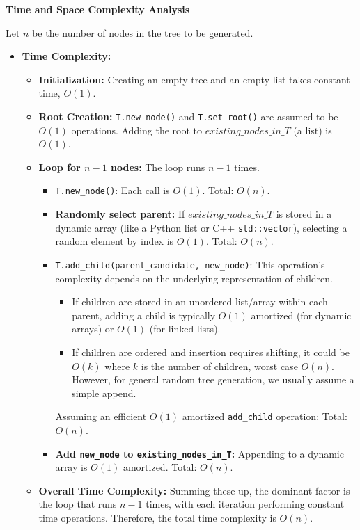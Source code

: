 \documentclass{article}
\begin{document}
\textbf{Time and Space Complexity Analysis}

Let $n$ be the number of nodes in the tree to be generated.

\begin{itemize}
    \item \textbf{Time Complexity:}
    \begin{itemize}
        \item \textbf{Initialization:} Creating an empty tree and an empty list takes constant time, $O(1)$.
        \item \textbf{Root Creation:} \texttt{T.new\_node()} and \texttt{T.set\_root()} are assumed to be $O(1)$ operations. Adding the root to $existing\_nodes\_in\_T$ (a list) is $O(1)$.
        \item \textbf{Loop for $n-1$ nodes:} The loop runs $n-1$ times.
        \begin{itemize}
            \item \texttt{T.new\_node()}: Each call is $O(1)$. Total: $O(n)$.
            \item \textbf{Randomly select parent:} If $existing\_nodes\_in\_T$ is stored in a dynamic array (like a Python list or C++ \texttt{std::vector}), selecting a random element by index is $O(1)$. Total: $O(n)$.
            \item \texttt{T.add\_child(parent\_candidate, new\_node)}: This operation's complexity depends on the underlying representation of children.
                \begin{itemize}
                    \item If children are stored in an unordered list/array within each parent, adding a child is typically $O(1)$ amortized (for dynamic arrays) or $O(1)$ (for linked lists).
                    \item If children are ordered and insertion requires shifting, it could be $O(k)$ where $k$ is the number of children, worst case $O(n)$. However, for general random tree generation, we usually assume a simple append.
                \end{itemize}
                Assuming an efficient $O(1)$ amortized \texttt{add\_child} operation: Total: $O(n)$.
            \item \textbf{Add \texttt{new\_node} to \texttt{existing\_nodes\_in\_T}:} Appending to a dynamic array is $O(1)$ amortized. Total: $O(n)$.
        \end{itemize}
        \item \textbf{Overall Time Complexity:} Summing these up, the dominant factor is the loop that runs $n-1$ times, with each iteration performing constant time operations. Therefore, the total time complexity is $O(n)$.
    \end{itemize}


\end{itemize}
\end{document}
